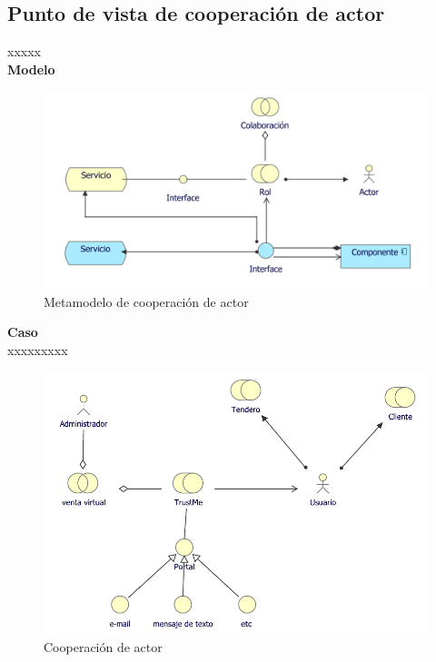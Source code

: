 	\subsection{Punto de vista de cooperación de actor}
	{ xxxxx\\
		
		\textbf{Modelo}\\
		\begin{figure}[H]
			\centering
			\includegraphics[width=0.8\linewidth]{development/cooperacionactor.png}
			\caption{Metamodelo de cooperación de actor}
		\end{figure}
		
		\textbf{Caso}\\
		xxxxxxxxx\\
		
		\begin{figure}[H]
			\centering
			\includegraphics[width=0.8\linewidth]{development/cooperacionactor.pdf}
			\caption{Cooperación de actor}
		\end{figure}
	}
	

